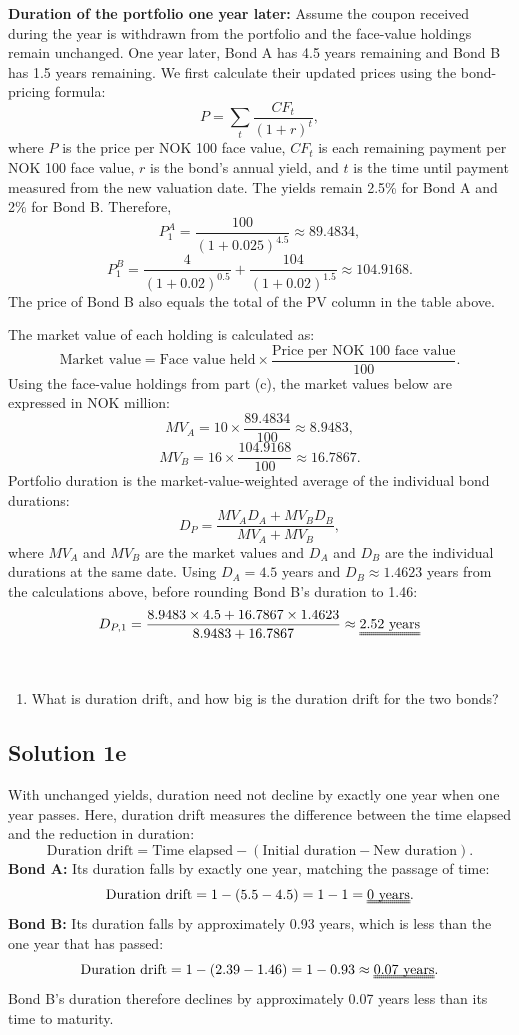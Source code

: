 \documentclass[12]{article}
\begin{document}
\noindent\textbf{Duration of the portfolio one year later:} Assume the coupon received during the year is withdrawn from the portfolio and the face-value holdings remain unchanged. One year later, Bond A has 4.5 years remaining and Bond B has 1.5 years remaining. We first calculate their updated prices using the bond-pricing formula:
\[P=\sum_t\frac{CF_t}{(1+r)^t},\]
where $P$ is the price per NOK 100 face value, $CF_t$ is each remaining payment per NOK 100 face value, $r$ is the bond's annual yield, and $t$ is the time until payment measured from the new valuation date. The yields remain 2.5\% for Bond A and 2\% for Bond B. Therefore,
\[P_1^A=\frac{100}{(1+0.025)^{4.5}}\approx89.4834,\]
\[P_1^B=\frac{4}{(1+0.02)^{0.5}}+\frac{104}{(1+0.02)^{1.5}}\approx104.9168.\]
The price of Bond B also equals the total of the PV column in the table above.
\par\noindent The market value of each holding is calculated as:
\[\text{Market value}=\text{Face value held}\times\frac{\text{Price per NOK 100 face value}}{100}.\]
Using the face-value holdings from part (c), the market values below are expressed in NOK million: \[MV_A=10\times\frac{89.4834}{100}\approx8.9483,\] \[MV_B=16\times\frac{104.9168}{100}\approx16.7867.\]
Portfolio duration is the market-value-weighted average of the individual bond durations:
\[D_P=\frac{MV_A D_A+MV_B D_B}{MV_A+MV_B},\]
where $MV_A$ and $MV_B$ are the market values and $D_A$ and $D_B$ are the individual durations at the same date. Using $D_A=4.5$ years and $D_B\approx1.4623$ years from the calculations above, before rounding Bond B's duration to 1.46:
\[D_{P,1}=\frac{8.9483\times4.5+16.7867\times1.4623}{8.9483+16.7867}\approx\uuline{2.52\text{ years}}\] \par\noindent


\noindent
\\
\color{black}
\color{black}
\begin{enumerate}
    \item[e)] What is duration drift, and how big is the duration drift for the two bonds?
\end{enumerate}

\color{blue}
\subsection*{Solution 1e}
\noindent With unchanged yields, duration need not decline by exactly one year when one year passes. Here, duration drift measures the difference between the time elapsed and the reduction in duration:
\[
\text{Duration drift}=\text{Time elapsed}-(\text{Initial duration}-\text{New duration}).
\]
\noindent\textbf{Bond A:}
Its duration falls by exactly one year, matching the passage of time:
\[
\text{Duration drift}=1-(5.5-4.5)=1-1=\text{\uuline{0 years}}.
\]
\noindent\textbf{Bond B:}
Its duration falls by approximately 0.93 years, which is less than the one year that has passed:
\[
\text{Duration drift}=1-(2.39-1.46)=1-0.93\approx\text{\uuline{0.07 years}}.
\]
\noindent Bond B's duration therefore declines by approximately 0.07 years less than its time to maturity.\\
\end{document}
